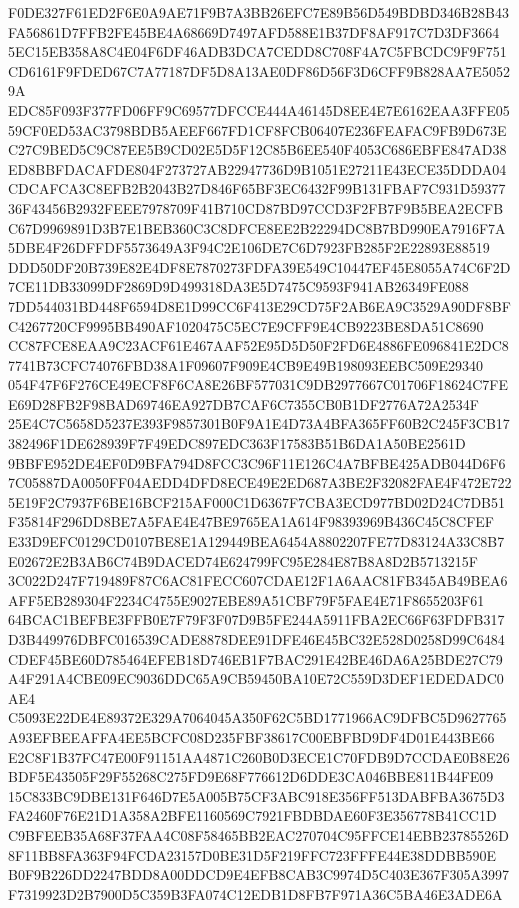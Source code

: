 \documentclass[UTF8,fontset=fandol,zihao=-4,a4paper]{ctexart}
\begin{document}
{{F0DE327F61ED2F6E0A9AE71F9B7A3BB26EFC7E89B56D549BDBD346B28B43FA56861D7FFB2FE45BE4A68669D7497AFD588E1B37DF8AF917C7D3DF3664
5EC15EB358A8C4E04F6DF46ADB3DCA7CEDD8C708F4A7C5FBCDC9F9F751CD6161F9FDED67C7A77187DF5D8A13AE0DF86D56F3D6CFF9B828AA7E50529A
EDC85F093F377FD06FF9C69577DFCCE444A46145D8EE4E7E6162EAA3FFE0559CF0ED53AC3798BDB5AEEF667FD1CF8FCB06407E236FEAFAC9FB9D673E
C27C9BED5C9C87EE5B9CD02E5D5F12C85B6EE540F4053C686EBFE847AD38ED8BBFDACAFDE804F273727AB22947736D9B1051E27211E43ECE35DDDA04
CDCAFCA3C8EFB2B2043B27D846F65BF3EC6432F99B131FBAF7C931D5937736F43456B2932FEEE7978709F41B710CD87BD97CCD3F2FB7F9B5BEA2ECFB
C67D9969891D3B7E1BEB360C3C8DFCE8EE2B22294DC8B7BD990EA7916F7A5DBE4F26DFFDF5573649A3F94C2E106DE7C6D7923FB285F2E22893E88519
DDD50DF20B739E82E4DF8E7870273FDFA39E549C10447EF45E8055A74C6F2D7CE11DB33099DF2869D9D499318DA3E5D7475C9593F941AB26349FE088
7DD544031BD448F6594D8E1D99CC6F413E29CD75F2AB6EA9C3529A90DF8BFC4267720CF9995BB490AF1020475C5EC7E9CFF9E4CB9223BE8DA51C8690
CC87FCE8EAA9C23ACF61E467AAF52E95D5D50F2FD6E4886FE096841E2DC87741B73CFC74076FBD38A1F09607F909E4CB9E49B198093EEBC509E29340
054F47F6F276CE49ECF8F6CA8E26BF577031C9DB2977667C01706F18624C7FEE69D28FB2F98BAD69746EA927DB7CAF6C7355CB0B1DF2776A72A2534F
25E4C7C5658D5237E393F9857301B0F9A1E4D73A4BFA365FF60B2C245F3CB17382496F1DE628939F7F49EDC897EDC363F17583B51B6DA1A50BE2561D
9BBFE952DE4EF0D9BFA794D8FCC3C96F11E126C4A7BFBE425ADB044D6F67C05887DA0050FF04AEDD4DFD8ECE49E2ED687A3BE2F32082FAE4F472E722
5E19F2C7937F6BE16BCF215AF000C1D6367F7CBA3ECD977BD02D24C7DB51F35814F296DD8BE7A5FAE4E47BE9765EA1A614F98393969B436C45C8CFEF
E33D9EFC0129CD0107BE8E1A129449BEA6454A8802207FE77D83124A33C8B7E02672E2B3AB6C74B9DACED74E624799FC95E284E87B8A8D2B5713215F
3C022D247F719489F87C6AC81FECC607CDAE12F1A6AAC81FB345AB49BEA6AFF5EB289304F2234C4755E9027EBE89A51CBF79F5FAE4E71F8655203F61
64BCAC1BEFBE3FFB0E7F79F3F07D9B5FE244A5911FBA2EC66F63FDFB317D3B449976DBFC016539CADE8878DEE91DFE46E45BC32E528D0258D99C6484
CDEF45BE60D785464EFEB18D746EB1F7BAC291E42BE46DA6A25BDE27C79A4F291A4CBE09EC9036DDC65A9CB59450BA10E72C559D3DEF1EDEDADC0AE4
C5093E22DE4E89372E329A7064045A350F62C5BD1771966AC9DFBC5D9627765A93EFBEEAFFA4EE5BCFC08D235FBF38617C00EBFBD9DF4D01E443BE66
E2C8F1B37FC47E00F91151AA4871C260B0D3ECE1C70FDB9D7CCDAE0B8E26BDF5E43505F29F55268C275FD9E68F776612D6DDE3CA046BBE811B44FE09
15C833BC9DBE131F646D7E5A005B75CF3ABC918E356FF513DABFBA3675D3FA2460F76E21D1A358A2BFE1160569C7921FBDBDAE60F3E356778B41CC1D
C9BFEEB35A68F37FAA4C08F58465BB2EAC270704C95FFCE14EBB23785526D8F11BB8FA363F94FCDA23157D0BE31D5F219FFC723FFFE44E38DDBB590E
B0F9B226DD2247BDD8A00DDCD9E4EFB8CAB3C9974D5C403E367F305A3997F7319923D2B7900D5C359B3FA074C12EDB1D8FB7F971A36C5BA46E3ADE6A
}}
\end{document}
